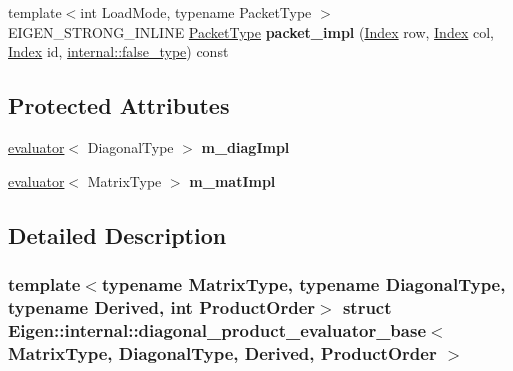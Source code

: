 \begin{DoxyCompactItemize}
\item 
\mbox{\label{struct_eigen_1_1internal_1_1diagonal__product__evaluator__base_ad0c8a0b3d0df8990abbab8c091df0bca}} 
{\footnotesize template$<$int Load\+Mode, typename Packet\+Type $>$ }\\E\+I\+G\+E\+N\+\_\+\+S\+T\+R\+O\+N\+G\+\_\+\+I\+N\+L\+I\+NE \hyperlink{struct_eigen_1_1_packet_type}{Packet\+Type} {\bfseries packet\+\_\+impl} (\hyperlink{namespace_eigen_a62e77e0933482dafde8fe197d9a2cfde}{Index} row, \hyperlink{namespace_eigen_a62e77e0933482dafde8fe197d9a2cfde}{Index} col, \hyperlink{namespace_eigen_a62e77e0933482dafde8fe197d9a2cfde}{Index} id, \hyperlink{struct_eigen_1_1internal_1_1false__type}{internal\+::false\+\_\+type}) const
\end{DoxyCompactItemize}
\subsection*{Protected Attributes}
\begin{DoxyCompactItemize}
\item 
\mbox{\label{struct_eigen_1_1internal_1_1diagonal__product__evaluator__base_a36241d5da66fc8a4a561d552e14027ed}} 
\hyperlink{struct_eigen_1_1internal_1_1evaluator}{evaluator}$<$ Diagonal\+Type $>$ {\bfseries m\+\_\+diag\+Impl}
\item 
\mbox{\label{struct_eigen_1_1internal_1_1diagonal__product__evaluator__base_aa288f4a1b6cc1f91dc30fedfea6af0e9}} 
\hyperlink{struct_eigen_1_1internal_1_1evaluator}{evaluator}$<$ Matrix\+Type $>$ {\bfseries m\+\_\+mat\+Impl}
\end{DoxyCompactItemize}


\subsection{Detailed Description}
\subsubsection*{template$<$typename Matrix\+Type, typename Diagonal\+Type, typename Derived, int Product\+Order$>$\newline
struct Eigen\+::internal\+::diagonal\+\_\+product\+\_\+evaluator\+\_\+base$<$ Matrix\+Type, Diagonal\+Type, Derived, Product\+Order $>$}



